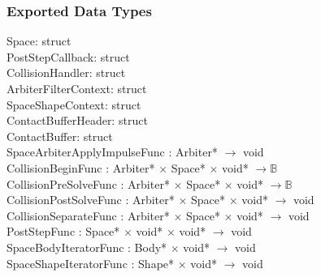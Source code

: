 \documentclass[12pt]{article}
\begin{document}
\subsubsection{Exported Data Types} \label{SecEDTSpace}
	Space: struct \\
	PostStepCallback: struct \\
	CollisionHandler: struct \\
	ArbiterFilterContext: struct \\
	SpaceShapeContext: struct \\
	ContactBufferHeader: struct \\
	ContactBuffer: struct \\
	SpaceArbiterApplyImpulseFunc : Arbiter* $\to$ void \\
	CollisionBeginFunc : Arbiter* $\times$ Space* $\times$ void* $\to \mathbb{B}$ \\
	CollisionPreSolveFunc : Arbiter* $\times$ Space* $\times$ void* $\to \mathbb{B}$ \\
	CollisionPostSolveFunc : Arbiter* $\times$ Space* $\times$ void* $\to$ void \\
	CollisionSeparateFunc : Arbiter* $\times$ Space* $\times$ void* $\to$ void \\
	PostStepFunc : Space* $\times$ void* $\times$ void* $\to$ void \\
	SpaceBodyIteratorFunc : Body* $\times$ void* $\to$ void \\
	SpaceShapeIteratorFunc : Shape* $\times$ void* $\to$ void
\end{document}
